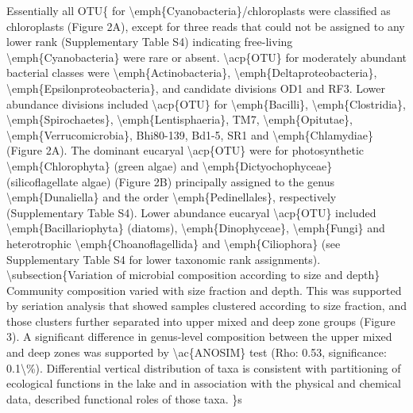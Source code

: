 Essentially all \acp{OTU{ for \emph{Cyanobacteria}/chloroplasts were classified as chloroplasts (Figure 2A), except for three reads that could not be assigned to any lower rank (Supplementary Table S4) indicating free-living \emph{Cyanobacteria} were rare or absent. 
\acp{OTU} for moderately abundant bacterial classes were \emph{Actinobacteria}, \emph{Deltaproteobacteria}, \emph{Epsilonproteobacteria}, and candidate divisions OD1 and RF3. 
Lower abundance divisions included \acp{OTU} for \emph{Bacilli}, \emph{Clostridia}, \emph{Spirochaetes}, \emph{Lentisphaeria}, TM7, \emph{Opitutae}, \emph{Verrucomicrobia}, Bhi80-139, Bd1-5, SR1 and \emph{Chlamydiae} (Figure 2A).

 The dominant eucaryal \acp{OTU} were for photosynthetic \emph{Chlorophyta} (green algae) and \emph{Dictyochophyceae} (silicoflagellate algae) (Figure 2B) principally assigned to the genus \emph{Dunaliella} and the order \emph{Pedinellales}, respectively (Supplementary Table S4). 
Lower abundance eucaryal \acp{OTU} included \emph{Bacillariophyta} (diatoms), \emph{Dinophyceae}, \emph{Fungi} and heterotrophic \emph{Choanoflagellida} and \emph{Ciliophora} (see Supplementary Table S4 for lower taxonomic rank assignments). 


\subsection{Variation of microbial composition according to size and depth}
Community composition varied with size fraction and depth. 
This was supported by seriation analysis that showed samples clustered according to size fraction, and those clusters further separated into upper mixed and deep zone groups (Figure 3). 
A significant difference in genus-level composition between the upper mixed and deep zones was supported by \ac{ANOSIM} test (Rho: 0.53, significance: 0.1\%). 
Differential vertical distribution of taxa is consistent with partitioning of ecological functions in the lake and in association with the physical and chemical data, described functional roles of those taxa.

}}
